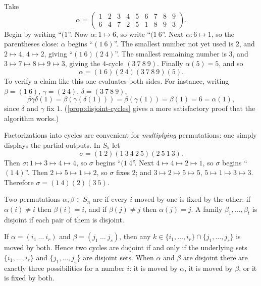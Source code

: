 \begin{eg}\label{eg:factor-algorithm}
	Take
	\[
		\alpha = \begin{pmatrix}
			1&2&3&4&5&6&7&8&9 \\
			6&4&7&2&5&1&8&9&3
		\end{pmatrix}.
	\]
	Begin by writing ``\((1\)''. Now \(\alpha\colon 1 \mapsto 6\), so write ``\((1\ 6\)''.
	Next \(\alpha\colon 6 \mapsto 1\), so the parentheses close: \(\alpha\) begins
	``\((1\ 6)\)''. The smallest number not yet used is \(2\), and \(2 \mapsto 4\),
	\(4 \mapsto 2\), giving ``\((1\ 6)(2\ 4)\)''. The smallest remaining number is \(3\),
	and \(3 \mapsto 7 \mapsto 8 \mapsto 9 \mapsto 3\), giving the \(4\)-cycle
	\((3\ 7\ 8\ 9)\). Finally \(\alpha(5) = 5\), and so
	\[
		\alpha = (1\ 6)(2\ 4)(3\ 7\ 8\ 9)(5).
	\]
	To verify a claim like this one evaluates both sides. For instance, writing
	\(\beta = (1\ 6)\), \(\gamma = (2\ 4)\), \(\delta = (3\ 7\ 8\ 9)\),
	\[
		\beta\gamma\delta(1) = \beta(\gamma(\delta(1))) = \beta(\gamma(1)) = \beta(1) = 6 = \alpha(1),
	\]
	since \(\delta\) and \(\gamma\) fix \(1\). (\autoref{prop:disjoint-cycles} gives a more
	satisfactory proof that the algorithm works.)
\end{eg}

\begin{eg}
	Factorizations into cycles are convenient for \emph{multiplying} permutations: one
	simply displays the partial outputs. In \(S_5\) let
	\[
		\sigma = (1\ 2)(1\ 3\ 4\ 2\ 5)(2\ 5\ 1\ 3).
	\]
	Then \(\sigma\colon 1 \mapsto 3 \mapsto 4 \mapsto 4\), so \(\sigma\) begins
	``\((1\ 4\)''. Next \(4 \mapsto 4 \mapsto 2 \mapsto 1\), so \(\sigma\) begins
	``\((1\ 4)\)''. Then \(2 \mapsto 5 \mapsto 1 \mapsto 2\), so \(\sigma\) fixes \(2\);
	and \(3 \mapsto 2 \mapsto 5 \mapsto 5\), \(5 \mapsto 1 \mapsto 3 \mapsto 3\).
	Therefore \(\sigma = (1\ 4)(2)(3\ 5)\).
\end{eg}

\begin{definition}
	Two permutations \(\alpha, \beta \in S_n\) are  if every \(i\) moved by
	one is fixed by the other: if \(\alpha(i) \neq i\) then \(\beta(i) = i\), and if
	\(\beta(j) \neq j\) then \(\alpha(j) = j\). A family \(\beta_1, \dots, \beta_t\) is
	disjoint if each pair of them is disjoint.
\end{definition}

\begin{observation}
	If \(\alpha = (i_1\ \dots\ i_r)\) and \(\beta = (j_1\ \dots\ j_s)\), then any
	\(k \in \{i_1, \dots, i_r\} \cap \{j_1, \dots, j_s\}\) is moved by both. Hence two
	cycles are disjoint if and only if the underlying sets
	\(\{i_1, \dots, i_r\}\) and \(\{j_1, \dots, j_s\}\) are disjoint sets. When
	\(\alpha\) and \(\beta\) are disjoint there are exactly three possibilities for a
	number \(i\): it is moved by \(\alpha\), it is moved by \(\beta\), or it is fixed by
	both.
\end{observation}

